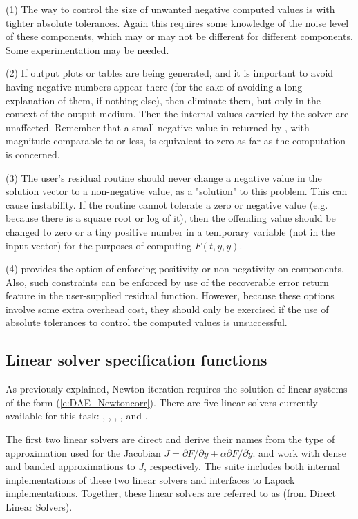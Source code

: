 (1) The way to control the size of unwanted negative computed values
is with tighter absolute tolerances.  Again this requires some
knowledge of the noise level of these components, which may or may not
be different for different components.  Some experimentation may be
needed.

(2) If output plots or tables are being generated, and it is important
to avoid having negative numbers appear there (for the sake of avoiding
a long explanation of them, if nothing else), then eliminate them, but
only in the context of the output medium.  Then the internal values carried
by the solver are unaffected.  Remember that a small negative value in 
returned by {\ida}, with magnitude comparable to  or less,
is equivalent to zero as far as the computation is concerned.

(3) The user's residual routine  should never change a
negative value in the solution vector  to a non-negative value,
as a "solution" to this problem.  This can cause instability.  If the
 routine cannot tolerate a zero or negative value (e.g. because
there is a square root or log of it), then the offending value should
be changed to zero or a tiny positive number in a temporary variable
(not in the input  vector) for the purposes of computing $F(t,y,\dot{y})$.

(4) {\ida} provides the option of enforcing positivity or non-negativity
on components.  Also, such constraints can be enforced by use of the
recoverable error return feature in the user-supplied residual function.
However, because these options involve some extra overhead cost, they
should only be exercised if the use of absolute tolerances to control
the computed values is unsuccessful.
\subsection{Linear solver specification functions}\label{sss:lin_solv_init}

As previously explained, Newton iteration requires the solution of
linear systems of the form (\ref{e:DAE_Newtoncorr}).  There are five {\ida} linear
solvers currently available for this task: {\idadense}, {\idaband}, 
{\idaspgmr}, {\idaspbcg}, and {\idasptfqmr}.

The first two linear solvers are direct and derive their
names from the type of approximation used for the Jacobian 
$J = \partial{F}/\partial{y} + \alpha \partial{F}/\partial{\dot{y}}$.
{\idadense} and {\idaband} work with dense and banded approximations to $J$,
respectively. The {\sundials} suite includes both internal implementations of
these two linear solvers and interfaces to Lapack implementations.
Together, these linear solvers are referred to as {\idadls} (from Direct
Linear Solvers).

